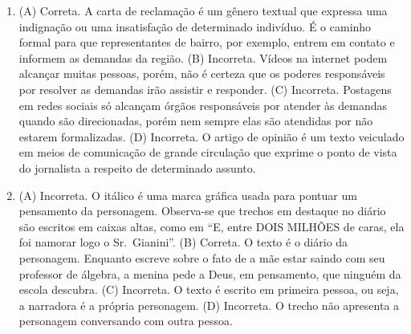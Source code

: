 \begin{enumerate}
\item (A) Correta. A carta de reclamação é um gênero textual que expressa uma
indignação ou uma insatisfação de determinado indivíduo. É o caminho
formal para que representantes de bairro, por exemplo, entrem em contato
e informem as demandas da região.
(B) Incorreta. Vídeos na internet podem alcançar muitas pessoas, porém,
não é certeza que os poderes responsáveis por resolver as demandas irão
assistir e responder.
(C) Incorreta. Postagens em redes sociais só alcançam órgãos responsáveis
por atender às demandas quando são direcionadas, porém nem sempre elas
são atendidas por não estarem formalizadas.
(D) Incorreta. O artigo de opinião é um texto veiculado em meios de
comunicação de grande circulação que exprime o ponto de vista do
jornalista a respeito de determinado assunto.

\item (A) Incorreta. O itálico é uma marca gráfica usada para pontuar um
pensamento da personagem. Observa-se que trechos em destaque no diário
são escritos em caixas altas, como em ``E, entre DOIS MILHÕES de caras,
ela foi namorar logo o Sr.~Gianini''.
(B) Correta. O texto é o diário da personagem. Enquanto escreve sobre o
fato de a mãe estar saindo com seu professor de álgebra, a menina pede a
Deus, em pensamento, que ninguém da escola descubra.
(C) Incorreta. O texto é escrito em primeira pessoa, ou seja, a narradora
é a própria personagem.
(D) Incorreta. O trecho não apresenta a personagem conversando com outra
pessoa.
\end{enumerate}


